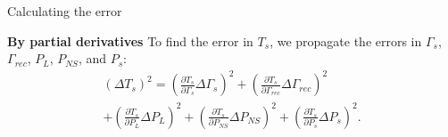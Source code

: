 \documentclass[aspectratio=169]{beamer}
\begin{document}
\begin{frame}{\small{Calculating the error}}

	\textbf{By partial derivatives}
	To find the error in \( T_s \), we propagate the errors in \( \Gamma_s \), \( \Gamma_{rec} \), \( P_L \), \( P_{NS} \), and \( P_s \):
	\begin{multline}
		(\Delta T_s)^2 = \left(\frac{\partial T_s}{\partial \Gamma_s} \Delta \Gamma_s\right)^2 + \left(\frac{\partial T_s}{\partial \Gamma_{rec}} \Delta \Gamma_{rec}\right)^2 \\ + \left(\frac{\partial T_s}{\partial P_L} \Delta P_L\right)^2 + \left(\frac{\partial T_s}{\partial P_{NS}} \Delta P_{NS}\right)^2 + \left(\frac{\partial T_s}{\partial P_s} \Delta P_s\right)^2.
	\end{multline}

\end{frame}
\end{document}
